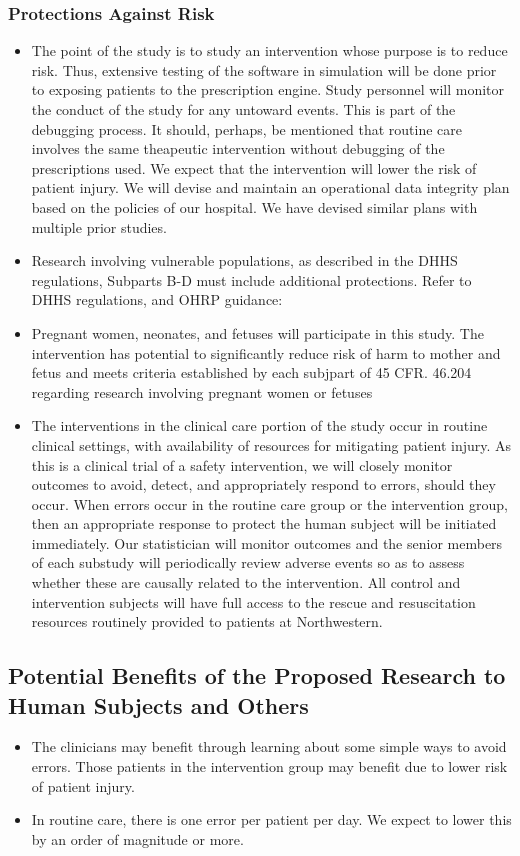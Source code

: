 \documentclass{article}
\begin{document}
\subsubsection{Protections Against Risk}
\begin{itemize}
\item The point of the study is to study an intervention whose purpose is to reduce risk. Thus, extensive testing of the software in simulation will be done prior to exposing patients to the prescription engine. Study personnel will monitor the conduct of the study for any untoward events. This is part of the debugging process. It should, perhaps, be mentioned that routine care involves the same theapeutic intervention without debugging of the prescriptions used. We expect that the intervention will lower the risk of patient injury. We will devise and maintain an operational data integrity plan based on the policies of our hospital. We have devised similar plans with multiple prior studies.
\item Research involving vulnerable populations, as described in the DHHS regulations, Subparts B-D must include additional protections. Refer to DHHS regulations, and OHRP guidance: 
\item Pregnant women, neonates, and fetuses will participate in this study. The intervention has potential to significantly reduce risk of harm to mother and fetus and meets criteria established by each subjpart of 45 CFR. 46.204 regarding research involving pregnant women or fetuses 
\item The interventions in the clinical care portion of the study occur in routine clinical settings, with availability of resources for mitigating patient injury. As this is a clinical trial of a safety intervention, we will closely monitor outcomes to avoid, detect, and appropriately respond to errors, should they occur. When errors occur in the routine care group or the intervention group, then an appropriate response to protect the human subject will be initiated immediately. Our statistician will monitor outcomes and the senior members of each substudy will periodically review adverse events so as to assess whether these are causally related to the intervention. All control and intervention subjects will have full access to the rescue and resuscitation resources routinely provided to patients at Northwestern.
\end{itemize}
\subsection{Potential Benefits of the Proposed Research to Human Subjects and Others}
\begin{itemize}
\item The clinicians may benefit through learning about some simple ways to avoid errors. Those patients in the intervention group may benefit due to lower risk of patient injury.
\item In routine care, there is one error per patient per day. We expect to lower this by an order of magnitude or more.
\end{itemize} 
\end{document}
